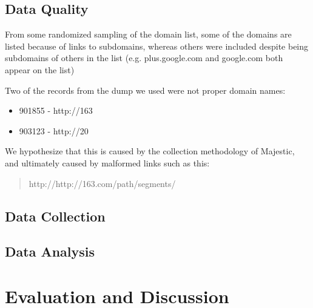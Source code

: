 \documentclass{idc_msc}
\begin{document}

\subsection{Data Quality}

From some randomized sampling of the domain list, some of the domains are listed because of links to subdomains, whereas others were included despite being subdomains of others in the list (e.g. plus.google.com and google.com both appear on the list)

Two of the records from the dump we used were not proper domain names:

\begin{itemize}
  \item 901855 - http://163
  \item 903123 - http://20
\end{itemize}

We hypothesize that this is caused by the collection methodology of Majestic, and ultimately caused by malformed links such as this:
\begin{quote}
http://http://163.com/path/segments/
\end{quote}

\subsection{Data Collection}

\subsection{Data Analysis}





\section{Evaluation and Discussion}
\end{document}

